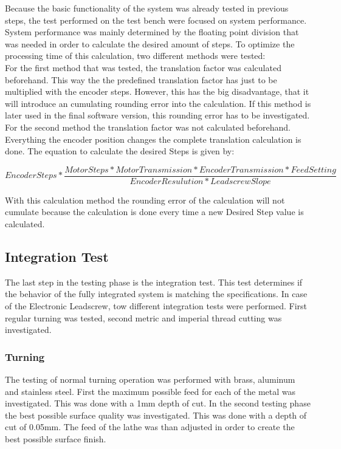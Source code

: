 Because the basic functionality of the system was already tested in previous steps, the test performed on the test bench were focused on system performance. System performance was mainly determined by the floating point division that was needed in order to calculate the desired amount of steps. To optimize the processing time of this calculation, two different methods were tested:\\

For the first method that was tested, the translation factor was calculated beforehand. This way the the predefined translation factor has just to be multiplied with the encoder steps. However, this has the big disadvantage, that it will introduce an cumulating rounding error into the calculation. If this method is later used in the final software version, this rounding error has to be investigated.\\

For the second method the translation factor was not calculated beforehand. Everything the encoder position changes the complete translation calculation is done. The equation to calculate the desired Steps is given by:

\begin{equation}
    Encoder Steps * \frac{ Motor Steps * Motor Transmission * Encoder Transmission * Feed Setting}{Encoder Resulution * Leadscrew Slope} 
\end{equation}

With this calculation method the rounding error of the calculation will not cumulate because the calculation is done every time a new Desired Step value is calculated.


\subsection{Integration Test}
The last step in the testing phase is the integration test. This test determines if the behavior of the fully integrated system is matching the specifications. In case of the Electronic Leadscrew, tow different integration tests were performed. First regular turning was tested, second metric and imperial thread cutting was investigated.

\subsubsection{Turning}
The testing of normal turning operation was performed with brass, aluminum and stainless steel. First the maximum possible feed for each of the metal was investigated. This was done with a 1mm depth of cut.
In the second testing phase the best possible surface quality was investigated. This was done with a depth of cut of 0.05mm. The feed of the lathe was than adjusted in order to create the best possible surface finish.

